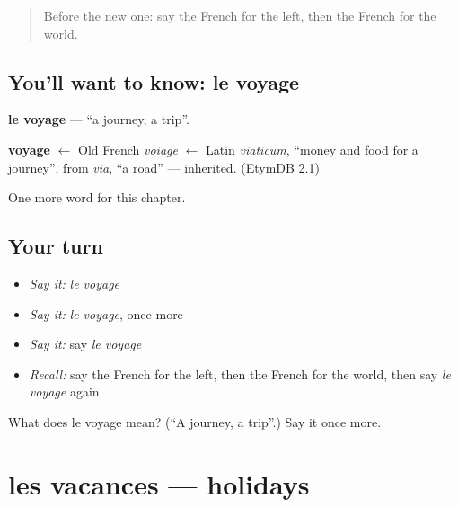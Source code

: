 \label{lesson:FR-C110-voyage}



\begin{quote}
Before the new one: say the French for the left, then the French for the world.
\end{quote}

\subsection*{You'll want to know: le voyage}
\textbf{le voyage} — \textquotedblleft{}a journey, a trip\textquotedblright{}.

\begin{cousinweb}
\textbf{voyage} $\leftarrow$ Old French \emph{voiage} $\leftarrow$ Latin \emph{viaticum}, \textquotedblleft{}money and food for a journey\textquotedblright{}, from \emph{via}, \textquotedblleft{}a road\textquotedblright{} — inherited. (EtymDB 2.1)
\end{cousinweb}

\begin{grammarlens}[title={What you've built}]
One more word for this chapter.
\end{grammarlens}

\subsection*{Your turn}
\begin{itemize}
\raggedright
  \item \emph{Say it:} \emph{le voyage}
  \item \emph{Say it:} \emph{le voyage}, once more
  \item \emph{Say it:} say \emph{le voyage}
  \item \emph{Recall:} say the French for the left, then the French for the world, then say \emph{le voyage} again
\end{itemize}

\begin{tcolorbox}[breakable,colback=teal!4,colframe=teal!35!black,title={Before you move on}]
What does le voyage mean? (\textquotedblleft{}A journey, a trip\textquotedblright{}.) Say it once more.
\end{tcolorbox}
\section[les vacances]{les vacances — holidays}

\label{lesson:FR-C110-vacances}




